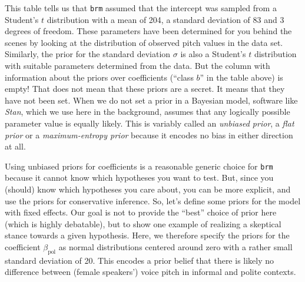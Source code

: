 \documentclass[nobib]{tufte-handout}
\begin{document}
This table tells us that \texttt{brm} assumed that the intercept was sampled from a Student's $t$ distribution with a mean of 204, a standard deviation of 83 and 3 degrees of freedom. These parameters have been determined for you behind the scenes by looking at the distribution of observed pitch values in the data set.
%
%
Similarly, the prior for the standard deviation $\sigma$ is also a Student's $t$ distribution with suitable parameters determined from the data.
But the column with information about the priors over coefficients (``class $b$'' in the table above) is empty!
That does not mean that these priors are a secret.
It means that they have not been set.
When we do not set a prior in a Bayesian model, software like \emph{Stan}, which we use here in the background, assumes that any logically possible parameter value is equally likely.
This is variably called an \textit{unbiased prior}, a \textit{flat prior} or a \textit{maximum-entropy prior} because it encodes no bias in either direction at all.


Using unbiased priors for coefficients is a reasonable generic choice for \texttt{brm} because
it cannot know which hypotheses you want to test. But, since you (should) know which hypotheses
you care about, you can be more explicit, and use the priors for conservative inference. 
%
So,
let's define some priors for the model with fixed effects. Our goal is not to provide the
``best'' choice of prior here (which is highly debatable), but to show one example of realizing
a skeptical stance towards a given hypothesis. Here, we therefore specify the priors for the
coefficient $\beta_{\text{pol}}$ as normal distributions centered around zero with a rather
small standard deviation of 20. This encodes a prior belief that there is likely no difference
between (female speakers') voice pitch in informal and polite contexts.
%
%
\end{document}
